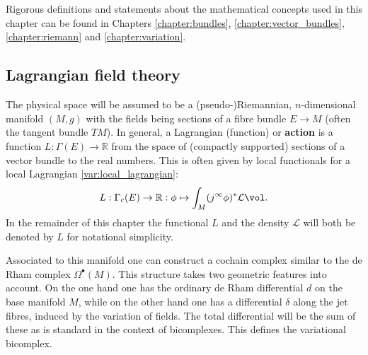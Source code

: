 \chapter{}\label{chapter:classical_fields}

    Rigorous definitions and statements about the mathematical concepts used in this chapter can be found in Chapters \ref{chapter:bundles}, \ref{chapter:vector_bundles}, \ref{chapter:riemann} and \ref{chapter:variation}.

\section{Lagrangian field theory}

    The physical space will be assumed to be a (pseudo-)Riemannian, $n$-dimensional manifold $(M,g)$ with the fields being sections of a fibre bundle $E\rightarrow M$ (often the tangent bundle $TM$). In general, a Lagrangian (function) or \textbf{action} is a function $L:\Gamma(E)\rightarrow\mathbb{R}$ from the space of (compactly supported) sections of a vector bundle to the real numbers. This is often given by local functionals for a local Lagrangian \ref{var:local_lagrangian}:
    \begin{gather}
        L:\Gamma_c(E)\rightarrow\mathbb{R}:\phi\mapsto\int_M(j^\infty\phi)^*\mathcal{L}\vol.
    \end{gather}
    In the remainder of this chapter the functional $L$ and the density $\mathcal{L}$ will both be denoted by $L$ for notational simplicity.

    Associated to this manifold one can construct a cochain complex similar to the de Rham complex $\Omega^\bullet(M)$. This structure takes two geometric features into account. On the one hand one has the ordinary de Rham differential $d$ on the base manifold $M$, while on the other hand one has a differential $\delta$ along the jet fibres, induced by the variation of fields. The total differential will be the sum of these as is standard in the context of bicomplexes. This defines the variational bicomplex.

